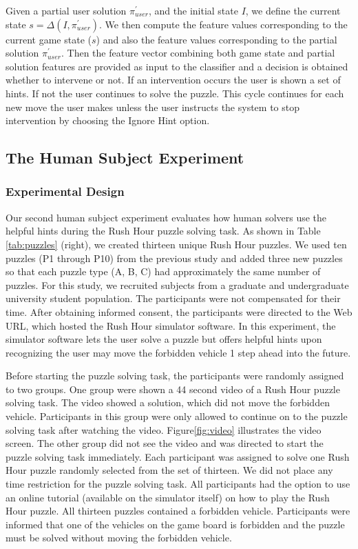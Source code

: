 Given a partial user solution $\pi^\prime _{user}$, and the initial state $I$, we define the current state $s = \Delta (I,\pi^\prime _{user})$. We then compute the feature values corresponding to the current game state ($s$) and also the feature values corresponding to the partial solution $\pi^\prime _{user}$. Then the feature vector combining both game state and partial solution features are provided as input to the classifier and a decision is obtained whether to intervene or not. If an intervention occurs the user is shown a set of hints. If not the user continues to solve the puzzle. This cycle continues for each new move the user makes unless the user instructs the system to stop intervention by choosing the Ignore Hint option.

\subsection*{The Human Subject Experiment}
\subsubsection*{Experimental Design}
Our second human subject experiment evaluates how human solvers use the helpful hints during the Rush Hour puzzle solving task. As shown in Table \ref{tab:puzzles} (right), we created thirteen unique Rush Hour puzzles. We used ten puzzles (P1 through P10) from the previous study and added three new puzzles so that each puzzle type (A, B, C) had approximately the same number of puzzles. For this study, we recruited subjects from a graduate and undergraduate university student population. The participants were not compensated for their time. After obtaining informed consent, the participants were directed to the Web URL, which hosted the Rush Hour simulator software. In this experiment, the simulator software lets the user solve a puzzle but offers helpful hints upon recognizing the user may move the forbidden vehicle 1 step ahead into the future.

Before starting the puzzle solving task, the participants were randomly assigned to two groups. One group were shown a 44 second video of a Rush Hour puzzle solving task. The video showed a solution, which did not move the forbidden vehicle. Participants in this group were only allowed to continue on to the puzzle solving task after watching the video. Figure\ref{fig:video} illustrates the video screen. The other group did not see the video and was directed to start the puzzle solving task immediately. Each participant was assigned to solve one Rush Hour puzzle randomly selected from the set of thirteen. We did not place any time restriction for the puzzle solving task. All participants had the option to use an online tutorial (available on the simulator itself) on how to play the Rush Hour puzzle. All thirteen puzzles contained a forbidden vehicle. Participants were informed that one of the vehicles on the game board is forbidden and the puzzle must be solved without moving the forbidden vehicle. 

